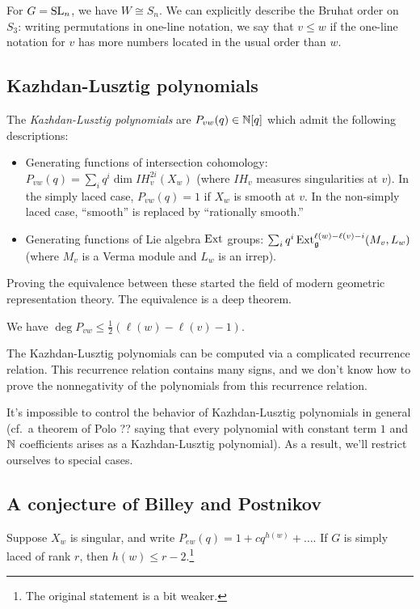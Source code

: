 \documentclass{amsart}
\begin{document}
\begin{ex}
	For $G = \mathrm{SL}_n$, we have $W \cong S_n$.
	We can explicitly describe the Bruhat order on $S_3$: writing permutations in one-line notation, we say that $v \leq w$ if the one-line notation for $v$ has more numbers located in the usual order than $w$.
\end{ex}

\subsection{Kazhdan-Lusztig polynomials}

The \emph{Kazhdan-Lusztig polynomials} are $P_{vw}(q) \in \mathbb{N}[q]$ which admit the following descriptions:
\begin{itemize}
	\item Generating functions of intersection cohomology: $P_{vw}(q) = \sum_i q^i \dim IH^{2i}_v(X_w)$ (where $IH_v$ measures singularities at $v$).
		In the simply laced case, $P_{vw}(q) = 1$ if $X_w$ is smooth at $v$.
		In the non-simply laced case, ``smooth'' is replaced by ``rationally smooth.''
	\item Generating functions of Lie algebra $\operatorname{Ext}$ groups: $\sum_i q^i \operatorname{Ext}^{\ell(w) - \ell(v) - i}_{\mathfrak{g}}(M_v, L_w)$ (where $M_v$ is a Verma module and $L_w$ is an irrep).
\end{itemize}
Proving the equivalence between these started the field of modern geometric representation theory.
The equivalence is a deep theorem.

We have $\deg P_{vw} \leq \frac{1}{2} (\ell(w) - \ell(v) - 1)$.

The Kazhdan-Lusztig polynomials can be computed via a complicated recurrence relation.
This recurrence relation contains many signs, and we don't know how to prove the nonnegativity of the polynomials from this recurrence relation.

It's impossible to control the behavior of Kazhdan-Lusztig polynomials in general (cf.\ a theorem of Polo ?? saying that every polynomial with constant term $1$ and $\mathbb{N}$ coefficients arises as a Kazhdan-Lusztig polynomial).
As a result, we'll restrict ourselves to special cases.

\subsection{A conjecture of Billey and Postnikov}

\begin{conj}
	Suppose $X_w$ is singular, and write $P_{ew}(q) = 1 + c q^{h(w)} + \dots$.
	If $G$ is simply laced of rank $r$, then $h(w) \leq r - 2$.\footnote{The original statement is a bit weaker.}
\end{conj}
\end{document}
